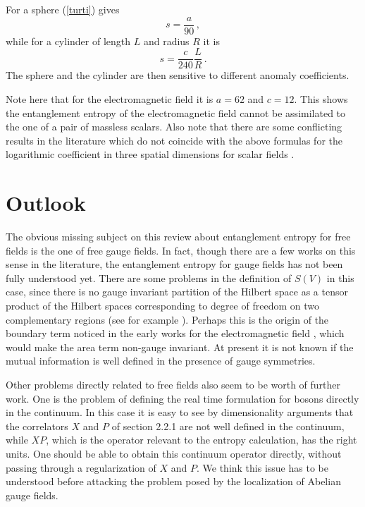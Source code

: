 \documentclass[11pt]{article}
\begin{document}
For a sphere (\ref{turti}) gives \cite{una}
\begin{equation}
s=\frac{a}{90}  \,,
\end{equation}
while for a cylinder of length $L$ and radius $R$ it is \cite{una}
\begin{equation}
s= \frac{c}{240}\frac{L}{R}\,.
\end{equation}
The sphere and the cylinder are then sensitive to different anomaly coefficients. 

Note here that for the electromagnetic field it is $a=62$ and $c=12$.  This shows the entanglement entropy of the electromagnetic field cannot be assimilated to the one of a pair of massless scalars. Also note that there are some conflicting results in the literature which do not coincide with the above formulas for the logarithmic coefficient in three spatial dimensions for scalar fields \cite{sch}. 


\section{Outlook}
The obvious missing subject on this review about entanglement entropy for free fields is the one of  free gauge fields. In fact, though there are a few works on this sense in the literature, the entanglement entropy for gauge fields has not been fully understood yet. There are some problems in the definition of $S(V)$ in this case, since there is no gauge invariant partition of the Hilbert space as a tensor product of the Hilbert spaces corresponding to degree of freedom on two complementary regions (see for example \cite{gauge}). Perhaps this is the origin of the boundary term noticed in the early works for the electromagnetic field \cite{Kabat}, which would make the area term non-gauge invariant. At present it is not known if the mutual information is well defined in the presence of gauge symmetries. 

Other problems directly related to free fields also seem to be worth of further work. One is the problem of defining the real time formulation for bosons directly in the continuum. In this case it is easy to see by dimensionality arguments that the correlators $X$ and $P$ of section 2.2.1 are not well defined in the continuum, while $XP$, which is the operator relevant to the entropy calculation, has the right units. One should be able to obtain this continuum operator directly, without passing through a regularization of $X$ and $P$. We think this issue has to be understood before attacking the problem posed by the localization of Abelian gauge fields. 
\end{document}
